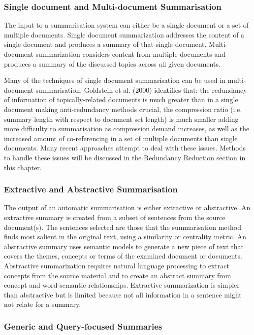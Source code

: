 \subsubsection{Single document and Multi-document Summarisation}

The input to a summarisation system can either be a single document or a set of multiple documents. Single document summarization addresses the content of a single document and produces a summary of that single document. Multi-document summarization considers content from multiple documents and produces a summary of the discussed topics across all given documents. 

Many of the techniques of single document summarisation can be used in multi-document summarisation. Goldstein et al. (2000) identifies that: the redundancy of information of topically-related documents is much greater than in a single document making anti-redundancy methods crucial, the compression ratio (i.e. summary length with respect to document set length) is much smaller adding more difficulty to summarisation as compression demand increases, as well as the increased amount of co-referencing in a set of multiple documents than single documents. Many recent approaches attempt to deal with these issues. Methods to handle these issues will be discussed in the Redundancy Reduction section in this chapter.

\subsubsection{Extractive and Abstractive Summarisation}

The output of an automatic summarisation is either extractive or abstractive. An extractive summary is created from a subset of sentences from the source document(s). The sentences selected are those that the summarisation method finds most salient in the original text, using a similarity or centrality metric. An abstractive summary uses semantic models to generate a new piece of text that covers the themes, concepts or terms of the examined document or documents. Abstractive summarization requires natural language processing to extract concepts from the source material and to create an abstract summary from concept and word semantic relationships. Extractive summarization is simpler than abstractive but is limited because not all information in a sentence might not relate for a summary.

\subsubsection{Generic and Query-focused Summaries}

